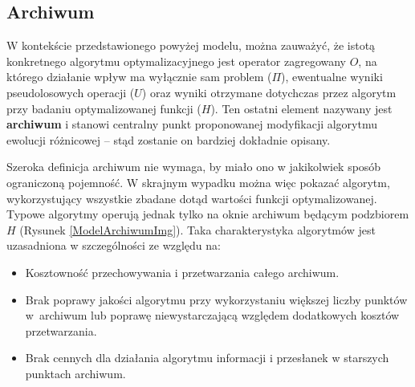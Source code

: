 \documentclass[12pt,a4paper]{report}
\begin{document}
{\subsection{Archiwum}
\label{ArchiveTheoryBase}
\par{
W kontekście przedstawionego powyżej modelu, można zauważyć, że istotą konkretnego algorytmu optymalizacyjnego jest operator zagregowany $O$, na którego działanie wpływ ma wyłącznie sam problem ($\Pi$), ewentualne wyniki pseudolosowych operacji ($U$) oraz wyniki otrzymane dotychczas przez algorytm przy badaniu optymalizowanej funkcji ($H$). Ten ostatni element nazywany jest \textbf{archiwum} i stanowi centralny punkt proponowanej modyfikacji algorytmu ewolucji różnicowej -- stąd zostanie on bardziej dokładnie opisany.
}
\par{
Szeroka definicja archiwum nie wymaga, by miało ono w jakikolwiek sposób ograniczoną pojemność. W skrajnym wypadku można więc pokazać algorytm, wykorzystujący wszystkie zbadane dotąd wartości funkcji optymalizowanej. Typowe algorytmy operują jednak tylko na oknie archiwum będącym podzbiorem $H$ (Rysunek \ref{ModelArchiwumImg}). Taka charakterystyka algorytmów jest uzasadniona w szczególności ze względu na:
\par{
	\begin{itemize}
		\item Kosztowność przechowywania i przetwarzania całego archiwum.
		\item Brak poprawy jakości algorytmu przy wykorzystaniu większej liczby punktów w~archiwum lub poprawę niewystarczającą względem dodatkowych kosztów przetwarzania.
		\item Brak cennych dla działania algorytmu informacji i przesłanek w starszych punktach archiwum.
\end{itemize}
}

}}
\end{document}
